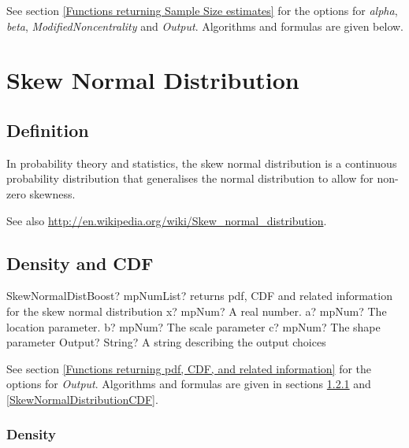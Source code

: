\vspace{0.3cm}
See section \ref{Functions returning Sample Size estimates} for the options for  {\itshape\sffamily alpha}, {\itshape\sffamily beta}, {\itshape\sffamily ModifiedNoncentrality} and {\itshape\sffamily Output}. Algorithms and formulas are given below.




\newpage
\section{Skew Normal Distribution}

\subsection{Definition}
\label{SkewNormalDistributionDefinition}

In probability theory and statistics, the skew normal distribution is a continuous probability distribution that generalises the normal distribution to allow for non-zero skewness.

See also \href{http://en.wikipedia.org/wiki/Skew_normal_distribution}{http://en.wikipedia.org/wiki/Skew\_normal\_distribution}. 


\subsection{Density and CDF}

\begin{mpFunctionsExtract}
	\mpFunctionFiveNotImplemented
	{SkewNormalDistBoost? mpNumList? returns pdf, CDF and related information for the skew normal distribution}
	{x? mpNum? A real number.}
	{a? mpNum? The location parameter.}
	{b? mpNum? The scale parameter}
	{c? mpNum? The shape parameter}
	{Output? String? A string describing the output choices}
\end{mpFunctionsExtract}


\vspace{0.3cm}
See section \ref{Functions returning pdf, CDF, and related information} for the options for {\itshape\sffamily Output}. Algorithms and formulas are given in sections \ref{SkewNormalDistributionDensity} and \ref{SkewNormalDistributionCDF}.




\subsubsection{Density}
\label{SkewNormalDistributionDensity}

